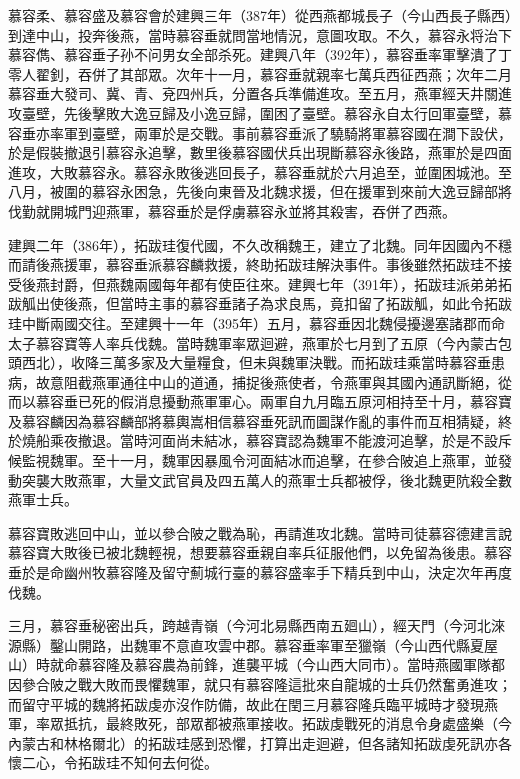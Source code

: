 慕容柔、慕容盛及慕容會於建興三年（387年）從西燕都城長子（今山西長子縣西）到達中山，投奔後燕，當時慕容垂就問當地情況，意圖攻取。不久，慕容永将治下慕容儁、慕容垂子孙不问男女全部杀死。建興八年（392年），慕容垂率軍擊潰了丁零人翟釗，吞併了其部眾。次年十一月，慕容垂就親率七萬兵西征西燕；次年二月慕容垂大發司、冀、青、兗四州兵，分置各兵準備進攻。至五月，燕軍經天井關進攻臺壁，先後擊敗大逸豆歸及小逸豆歸，圍困了臺壁。慕容永自太行回軍臺壁，慕容垂亦率軍到臺壁，兩軍於是交戰。事前慕容垂派了驍騎將軍慕容國在澗下設伏，於是假裝撤退引慕容永追擊，數里後慕容國伏兵出現斷慕容永後路，燕軍於是四面進攻，大敗慕容永。慕容永敗後逃回長子，慕容垂就於六月追至，並圍困城池。至八月，被圍的慕容永困急，先後向東晉及北魏求援，但在援軍到來前大逸豆歸部將伐勤就開城門迎燕軍，慕容垂於是俘虜慕容永並將其殺害，吞併了西燕。

建興二年（386年），拓跋珪復代國，不久改稱魏王，建立了北魏。同年因國內不穩而請後燕援軍，慕容垂派慕容麟救援，終助拓跋珪解決事件。事後雖然拓跋珪不接受後燕封爵，但燕魏兩國每年都有使臣往來。建興七年（391年），拓跋珪派弟弟拓跋觚出使後燕，但當時主事的慕容垂諸子為求良馬，竟扣留了拓跋觚，如此令拓跋珪中斷兩國交往。至建興十一年（395年）五月，慕容垂因北魏侵擾邊塞諸郡而命太子慕容寶等人率兵伐魏。當時魏軍率眾迴避，燕軍於七月到了五原（今內蒙古包頭西北），收降三萬多家及大量糧食，但未與魏軍決戰。而拓跋珪乘當時慕容垂患病，故意阻截燕軍通往中山的道通，捕捉後燕使者，令燕軍與其國內通訊斷絕，從而以慕容垂已死的假消息擾動燕軍軍心。兩軍自九月臨五原河相持至十月，慕容寶及慕容麟因為慕容麟部將慕輿嵩相信慕容垂死訊而圖謀作亂的事件而互相猜疑，終於燒船乘夜撤退。當時河面尚未結冰，慕容寶認為魏軍不能渡河追擊，於是不設斥候監視魏軍。至十一月，魏軍因暴風令河面結冰而追擊，在參合陂追上燕軍，並發動突襲大敗燕軍，大量文武官員及四五萬人的燕軍士兵都被俘，後北魏更阬殺全數燕軍士兵。

慕容寶敗逃回中山，並以參合陂之戰為恥，再請進攻北魏。當時司徒慕容德建言說慕容寶大敗後已被北魏輕視，想要慕容垂親自率兵征服他們，以免留為後患。慕容垂於是命幽州牧慕容隆及留守薊城行臺的慕容盛率手下精兵到中山，決定次年再度伐魏。

三月，慕容垂秘密出兵，跨越青嶺（今河北易縣西南五廻山），經天門（今河北淶源縣）鑿山開路，出魏軍不意直攻雲中郡。慕容垂率軍至獵嶺（今山西代縣夏屋山）時就命慕容隆及慕容農為前鋒，進襲平城（今山西大同市）。當時燕國軍隊都因參合陂之戰大敗而畏懼魏軍，就只有慕容隆這批來自龍城的士兵仍然奮勇進攻；而留守平城的魏將拓跋虔亦沒作防備，故此在閏三月慕容隆兵臨平城時才發現燕軍，率眾抵抗，最終敗死，部眾都被燕軍接收。拓跋虔戰死的消息令身處盛樂（今內蒙古和林格爾北）的拓跋珪感到恐懼，打算出走迴避，但各諸知拓跋虔死訊亦各懷二心，令拓跋珪不知何去何從。

